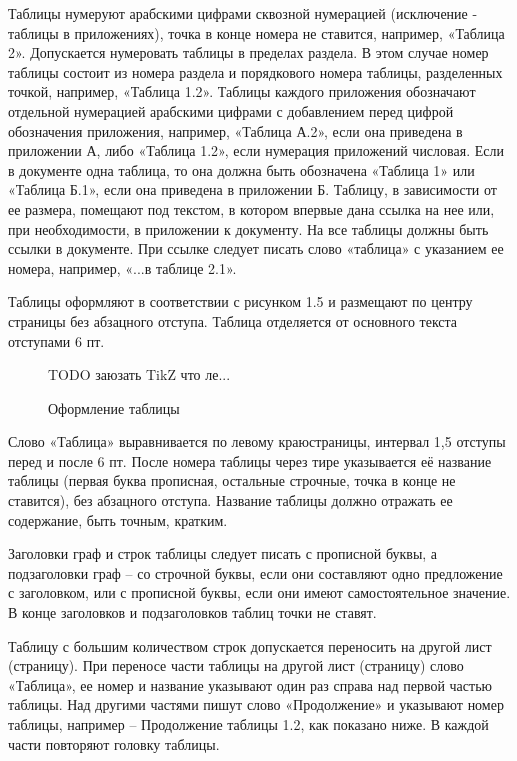 Таблицы нумеруют арабскими цифрами сквозной нумерацией (исключение - таблицы в
приложениях), точка в конце номера не ставится, например, «Таблица 2». Допускается
нумеровать таблицы в пределах раздела. В этом случае номер таблицы состоит из номера
раздела и порядкового номера таблицы, разделенных точкой, например, «Таблица 1.2». Таблицы
каждого приложения обозначают отдельной нумерацией арабскими цифрами с добавлением
перед цифрой обозначения приложения, например, «Таблица А.2», если она приведена в
приложении А, либо «Таблица 1.2», если нумерация приложений числовая. Если в документе
одна таблица, то она должна быть обозначена «Таблица 1» или «Таблица Б.1», если она
приведена в приложении Б. Таблицу, в зависимости от ее размера, помещают под текстом, в
котором впервые дана ссылка на нее или, при необходимости, в приложении к документу. На
все таблицы должны быть ссылки в документе. При ссылке следует писать слово «таблица» с
указанием ее номера, например, «...в таблице 2.1».

Таблицы оформляют в соответствии с рисунком 1.5 и размещают по центру страницы без
абзацного отступа. Таблица отделяется от основного текста отступами 6 пт.

\begin{figure}[h]
	\begin{mdframed}
		\centerline{TODO заюзать TikZ что ле...}
	\end{mdframed}
	\caption{Оформление таблицы}
	\label{subsects}
\end{figure}

Слово «Таблица» выравнивается по левому краюстраницы, интервал 1,5 отступы перед и
после 6 пт. После номера таблицы через тире указывается её название таблицы (первая буква
прописная, остальные строчные, точка в конце не ставится), без абзацного отступа. Название
таблицы должно отражать ее содержание, быть точным, кратким.

Заголовки граф и строк таблицы следует писать с прописной буквы, а подзаголовки
граф – со строчной буквы, если они составляют одно предложение с заголовком, или с
прописной буквы, если они имеют самостоятельное значение. В конце заголовков и
подзаголовков таблиц точки не ставят.

Таблицу с большим количеством строк допускается переносить на другой лист
(страницу). При переносе части таблицы на другой лист (страницу) слово «Таблица», ее номер
и название указывают один раз справа над первой частью таблицы. Над другими частями пишут
слово «Продолжение» и указывают номер таблицы, например – Продолжение таблицы 1.2, как
показано ниже. В каждой части повторяют головку таблицы.

